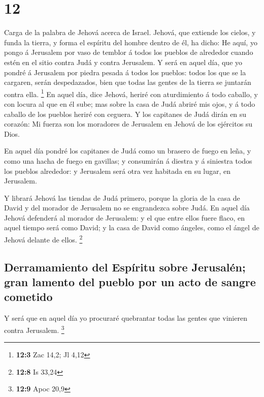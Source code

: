 \hypertarget{section-11}{%
\section{12}\label{section-11}}

 Carga de la palabra de Jehová acerca de Israel. Jehová, que
extiende los cielos, y funda la tierra, y forma el espíritu del hombre
dentro de él, ha dicho:  He aquí, yo pongo á Jerusalem por
vaso de temblor á todos los pueblos de alrededor cuando estén en el
sitio contra Judá y contra Jerusalem.  Y será en aquel día,
que yo pondré á Jerusalem por piedra pesada á todos los pueblos: todos
los que se la cargaren, serán despedazados, bien que todas las gentes de
la tierra se juntarán contra ella. \footnote{\textbf{12:3} Zac 14,2; Jl
  4,12}  En aquel día, dice Jehová, heriré con aturdimiento
á todo caballo, y con locura al que en él sube; mas sobre la casa de
Judá abriré mis ojos, y á todo caballo de los pueblos heriré con
ceguera.  Y los capitanes de Judá dirán en su corazón: Mi
fuerza son los moradores de Jerusalem en Jehová de los ejércitos su
Dios.

 En aquel día pondré los capitanes de Judá como un brasero
de fuego en leña, y como una hacha de fuego en gavillas; y consumirán á
diestra y á siniestra todos los pueblos alrededor: y Jerusalem será otra
vez habitada en su lugar, en Jerusalem.

 Y librará Jehová las tiendas de Judá primero, porque la
gloria de la casa de David y del morador de Jerusalem no se engrandezca
sobre Judá.  En aquel día Jehová defenderá al morador de
Jerusalem: y el que entre ellos fuere flaco, en aquel tiempo será como
David; y la casa de David como ángeles, como el ángel de Jehová delante
de ellos. \footnote{\textbf{12:8} Is 33,24}

\hypertarget{derramamiento-del-espuxedritu-sobre-jerusaluxe9n-gran-lamento-del-pueblo-por-un-acto-de-sangre-cometido}{%
\subsection{Derramamiento del Espíritu sobre Jerusalén; gran lamento del
pueblo por un acto de sangre
cometido}\label{derramamiento-del-espuxedritu-sobre-jerusaluxe9n-gran-lamento-del-pueblo-por-un-acto-de-sangre-cometido}}

 Y será que en aquel día yo procuraré quebrantar todas las
gentes que vinieren contra Jerusalem. \footnote{\textbf{12:9} Apoc 20,9}

